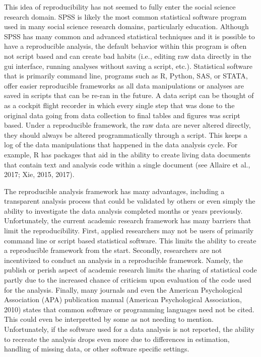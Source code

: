 \documentclass[english,,man]{apa6}
\theoremstyle{definition}
\theoremstyle{definition}
\theoremstyle{definition}
\theoremstyle{remark}
\begin{document}
This idea of reproducibility has not seemed to fully enter the social
science research domain. SPSS is likely the most common statistical
software program used in many social science research domains,
particularly education. Although SPSS has many common and advanced
statistical techniques and it is possible to have a reproducible
analysis, the default behavior within this program is often not script
based and can create bad habits (i.e., editing raw data directly in the
gui interface, running analyses without saving a script, etc.).
Statistical software that is primarily command line, programs such as R,
Python, SAS, or STATA, offer easier reproducible frameworks as all data
manipulations or analyses are saved in scripts that can be re-ran in the
future. A data script can be thought of as a cockpit flight recorder in
which every single step that was done to the original data going from
data collection to final tables and figures was script based. Under a
reproducible framework, the raw data are never altered directly, they
should always be altered programmatically through a script. This keeps a
log of the data manipulations that happened in the data analysis cycle.
For example, R has packages that aid in the ability to create living
data documents that contain text and analysis code within a single
document (see Allaire et al., 2017; Xie, 2015, 2017).

The reproducible analysis framework has many advantages, including a
transparent analysis process that could be validated by others or even
simply the ability to investigate the data analysis completed months or
years previously. Unfortunately, the current academic research framework
has many barriers that limit the reproducibility. First, applied
researchers may not be users of primarily command line or script based
statistical software. This limits the ability to create a reproducible
framework from the start. Secondly, researchers are not incentivized to
conduct an analysis in a reproducible framework. Namely, the publish or
perish aspect of academic research limits the sharing of statistical
code partly due to the increased chance of criticism upon evaluation of
the code used for the analysis. Finally, many journals and even the
American Psychological Association (APA) publication manual (American
Psychological Association, 2010) states that common software or
programming languages need not be cited. This could even be interpretted
by some as not needing to mention. Unfortunately, if the software used
for a data analysis is not reported, the ability to recreate the
analysis drops even more due to differences in estimation, handling of
missing data, or other software specific settings.
\end{document}
